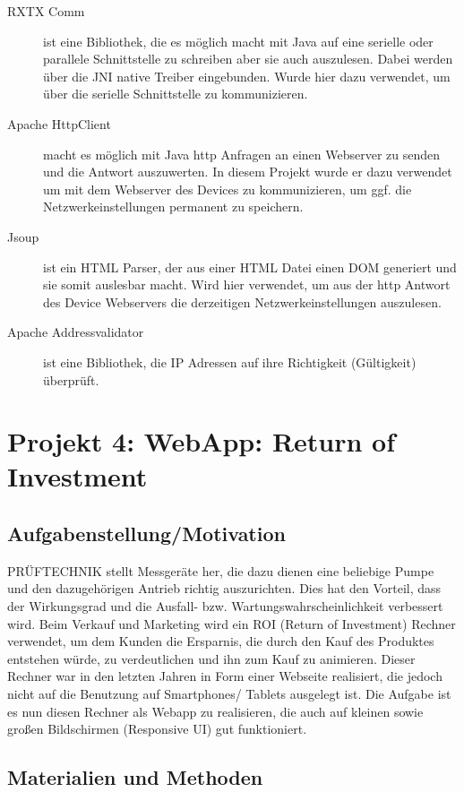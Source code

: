 \documentclass{article}
\begin{document}
		\begin{description}
			\item[RXTX Comm]
					ist eine Bibliothek, die es möglich macht mit Java auf eine serielle oder parallele Schnittstelle zu schreiben aber sie auch auszulesen. Dabei werden über die JNI native Treiber eingebunden. Wurde hier dazu verwendet, um über die serielle Schnittstelle zu kommunizieren.
			\item[Apache HttpClient] 
					macht es möglich mit Java http Anfragen an einen Webserver zu senden und die Antwort auszuwerten. In diesem Projekt wurde er dazu verwendet um mit dem Webserver des Devices zu kommunizieren, um ggf. die Netzwerkeinstellungen permanent zu speichern.
			\item[Jsoup] 
					ist ein HTML Parser, der aus einer HTML Datei einen DOM generiert und sie somit auslesbar macht. Wird hier verwendet, um aus der http Antwort des Device Webservers die derzeitigen Netzwerkeinstellungen auszulesen.
			\item[Apache Addressvalidator]
					ist eine Bibliothek, die IP Adressen auf ihre Richtigkeit (Gültigkeit) überprüft.
		\end{description}
		
\section{Projekt 4: WebApp: Return of Investment} 
	\subsection{Aufgabenstellung/Motivation}
		PRÜFTECHNIK stellt Messgeräte her, die dazu dienen eine beliebige Pumpe und den dazugehörigen Antrieb richtig auszurichten. Dies hat den Vorteil, dass der Wirkungsgrad und die Ausfall- bzw. Wartungswahrscheinlichkeit verbessert wird.
		Beim Verkauf und Marketing wird ein ROI (Return of Investment) Rechner verwendet, um dem Kunden die Ersparnis, die durch den Kauf des Produktes entstehen würde, zu verdeutlichen und ihn zum Kauf zu animieren.
		Dieser Rechner war in den letzten Jahren in Form einer Webseite realisiert, die jedoch nicht auf die Benutzung auf Smartphones/ Tablets ausgelegt ist.
		Die Aufgabe ist es nun diesen Rechner als Webapp zu realisieren, die auch auf kleinen sowie großen Bildschirmen (Responsive UI) gut funktioniert.
	\subsection{Materialien und Methoden}
\end{document}
